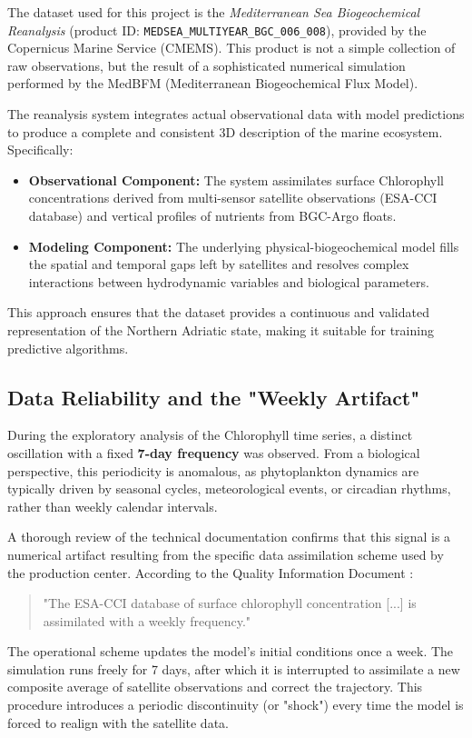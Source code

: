 The dataset used for this project is the \textit{Mediterranean Sea Biogeochemical Reanalysis} (product ID: \texttt{MEDSEA\_MULTIYEAR\_BGC\_006\_008}), provided by the Copernicus Marine Service (CMEMS).
This product is not a simple collection of raw observations, but the result of a sophisticated numerical simulation performed by the MedBFM (Mediterranean Biogeochemical Flux Model).

The reanalysis system integrates actual observational data with model predictions to produce a complete and consistent 3D description of the marine ecosystem. Specifically:
\begin{itemize}
    \item \textbf{Observational Component:} The system assimilates surface Chlorophyll concentrations derived from multi-sensor satellite observations (ESA-CCI database) and vertical profiles of nutrients from BGC-Argo floats.
    \item \textbf{Modeling Component:} The underlying physical-biogeochemical model fills the spatial and temporal gaps left by satellites and resolves complex interactions between hydrodynamic variables and biological parameters.
\end{itemize}

This approach ensures that the dataset provides a continuous and validated representation of the Northern Adriatic state, making it suitable for training predictive algorithms.

\subsection{Data Reliability and the "Weekly Artifact"}

During the exploratory analysis of the Chlorophyll time series, a distinct oscillation with a fixed \textbf{7-day frequency} was observed. From a biological perspective, this periodicity is anomalous, as phytoplankton dynamics are typically driven by seasonal cycles, meteorological events, or circadian rhythms, rather than weekly calendar intervals.

A thorough review of the technical documentation confirms that this signal is a numerical artifact resulting from the specific data assimilation scheme used by the production center. According to the Quality Information Document \cite{cmems_quid}:
\begin{quote}
    "The ESA-CCI database of surface chlorophyll concentration [...] is assimilated with a weekly frequency."
\end{quote}
The operational scheme updates the model's initial conditions once a week. The simulation runs freely for 7 days, after which it is interrupted to assimilate a new composite average of satellite observations and correct the trajectory. This procedure introduces a periodic discontinuity (or "shock") every time the model is forced to realign with the satellite data.


